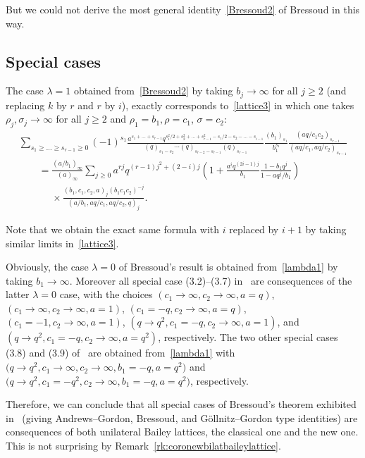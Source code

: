 \documentclass[pdftex]{sigma}
\numberwithin{equation}{section}
\begin{document}
But we could not derive the most general identity~\eqref{Bressoud2} of Bressoud in this way.

\subsection{Special cases}

The case $\lambda=1$ obtained from~\eqref{Bressoud2} by taking $b_j\to\infty$ for all $j\geq2$ (and replacing $k$ by $r$ and $r$ by $i$), exactly corresponds to~\eqref{lattice3} in which one takes $\rho_j,\sigma_j\to\infty$ for all $j\geq2$ and $\rho_1=b_1,\rho=c_1$, $\sigma=c_2$:
\begin{gather}
\sum_{s_1\geq\dots\geq s_{r-1}\geq0}(-1)^{s_1}\frac{a^{s_1+\dots+s_{r-1}}q^{s_1^2/2+s_2^2+\dots+s_{r-1}^2-s_{1}/2-s_{2}-\dots-s_{i-1}}}{(q)_{s_1-s_2} \cdots(q)_{s_{r-2}-s_{r-1}}(q)_{s_{r-1}}}
\frac{(b_1)_{s_1}}{b_1^{s_1}}\frac{(aq/c_1c_2)_{s_{r-1}}}{(aq/c_1,aq/c_2)_{s_{r-1}}}\nonumber\\
\qquad=\frac{(a/b_1)_\infty}{(a)_\infty}\sum_{j\geq0}a^{rj}q^{(r-1)j^2+(2-i)j}\left(1+\frac{a^{i}q^{(2i-1)j}}{b_1}\frac{1-b_1q^j}{1-aq^j/b_1}\right)\nonumber\\
\phantom{\qquad=}{}\times\frac{(b_1,c_1,c_2,a)_j(b_1c_1c_2)^{-j}}{(a/b_1,aq/c_1,aq/c_2,q)_j}.\label{lambda1}
\end{gather}

Note that we obtain the exact same formula with $i$ replaced by $i+1$ by taking similar limits in~\eqref{lattice3}.

Obviously, the case $\lambda=0$ of Bressoud's result is obtained from~\eqref{lambda1} by taking $b_1\to\infty$. Moreover all special case (3.2)--(3.7) in~\cite{Br80} are consequences of the latter $\lambda=0$ case, with the choices $(c_1\to\infty,c_2\to\infty,a=q)$, $(c_1\to\infty,c_2\to\infty,a=1)$, $(c_1=-q,c_2\to\infty,a=q)$, $(c_1=-1,c_2\to\infty,a=1)$, $(q\to q^2,c_1=-q,c_2\to\infty,a=1)$, and $(q\to q^2,c_1=-q,c_2\to\infty,a=q^2)$, respectively.
The two other special cases (3.8) and (3.9) of~\cite{Br80} are obtained from~\eqref{lambda1} with $\bigl(q\to q^2,c_1\to\infty,c_2\to\infty,b_1=-q,a=q^2\bigr)$ and $\bigl(q\to q^2,c_1=-q^2,c_2\to\infty,b_1=-q,a=q^2\bigr)$, respectively.

Therefore, we can conclude that all special cases of Bressoud's theorem exhibited in~\cite{Br80} (giving Andrews--Gordon, Bressoud, and G\"ollnitz--Gordon type identities) are consequences of both unilateral Bailey lattices, the classical one and the new one. This is not surprising by Remark~\ref{rk:coronewbilatbaileylattice}.
\end{document}
